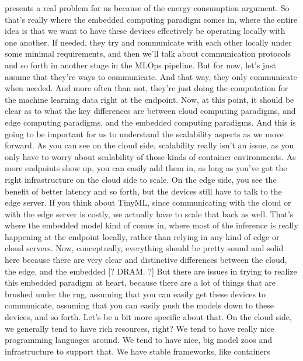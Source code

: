 {{{{{    presents a real problem for us because of the energy consumption argument.
    So that's really where the embedded computing paradigm comes in,
    where the entire idea is that we want to have these devices effectively
    be operating locally with one another.
    If needed, they try and communicate with each other locally
    under some minimal requirements, and then we'll
    talk about communication protocols and so forth
    in another stage in the MLOps pipeline.
    But for now, let's just assume that they're ways to communicate.
    And that way, they only communicate when needed.
    And more often than not, they're just doing
    the computation for the machine learning data right at the endpoint.
    Now, at this point, it should be clear as
    to what the key differences are between cloud computing paradigms,
    and edge computing paradigms, and the embedded computing paradigms.
    And this is going to be important for us to understand the scalability aspects
    as we move forward.
    As you can see on the cloud side, scalability really isn't an issue,
    as you only have to worry about scalability of those kinds of container
    environments.
    As more endpoints show up, you can easily add them in,
    as long as you've got the right infrastructure on the cloud side
    to scale.
    On the edge side, you see the benefit of better latency and so forth,
    but the devices still have to talk to the edge server.
    If you think about TinyML, since communicating with the cloud
    or with the edge server is costly, we actually
    have to scale that back as well.
    That's where the embedded model kind of comes in, where most of the inference
    is really happening at the endpoint locally, rather than relying
    in any kind of edge or cloud servers.
    Now, conceptually, everything should be pretty sound and solid here
    because there are very clear and distinctive differences
    between the cloud, the edge, and the embedded [? DRAM. ?]
    But there are issues in trying to realize this embedded paradigm
    at heart, because there are a lot of things that are brushed under the rug,
    assuming that you can easily get these devices to communicate,
    assuming that you can easily push the models down to these devices,
    and so forth.
    Let's be a bit more specific about that.
    On the cloud side, we generally tend to have rich resources, right?
    We tend to have really nice programming languages around.
    We tend to have nice, big model zoos and infrastructure to support that.
    We have stable frameworks, like containers
}}}}}
